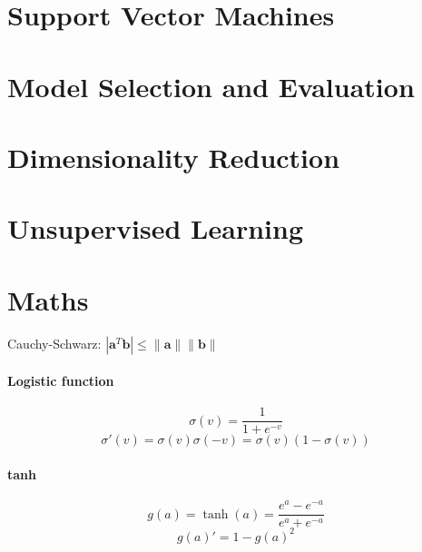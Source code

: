 \documentclass[7pt]{scrartcl}
\begin{document}
\begin{multicols}{4}
\section{Support Vector Machines}
\section{Model Selection and Evaluation}
\section{Dimensionality Reduction}
\section{Unsupervised Learning}
\section{Maths}
Cauchy-Schwarz: $|\mathbf a ^T \mathbf b|\leq \| \mathbf a \| \| \mathbf b \|$
\paragraph{Logistic function}
$$\sigma(v) = \frac{1}{1+e^{-v}}$$
$$\sigma'(v) = \sigma(v)\sigma(-v) = \sigma(v)(1-\sigma(v))$$
\paragraph{tanh}
$$g(a)=\tanh(a)=\frac{e^a-e^{-a}}{e^a + e^{-a}}$$
$$g(a)'=1 - g(a)^2$$
\end{multicols}
\end{document}
